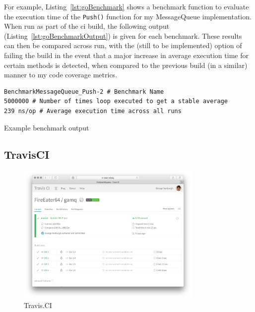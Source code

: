 For example, Listing~\ref{lst:goBenchmark} shows a benchmark function to
evaluate the execution time of the \texttt{Push()} function for my
MessageQueue implementation. When run as part of the \gls{ci} build, the
following output (Listing~\ref{lst:goBenchmarkOutput}) is given for each
benchmark. These results can then be compared across run, with the (still to be
implemented) option of failing the build in the event that a major increase in
average execution time for certain methods is detected, when compared to the
previous build (in a similar) manner to my code coverage metrics.

\begin{listing}
  \centering
  \begin{verbatim}
BenchmarkMessageQueue_Push-2 # Benchmark Name
5000000 # Number of times loop executed to get a stable average
239 ns/op # Average execution time across all runs
  \end{verbatim}
  \caption{Example benchmark output}
  \label{lst:goBenchmarkOutput}
\end{listing}


\subsection{TravisCI}
\label{sub:TravisCI}

\begin{figure}[H]
  \includegraphics[width=0.8\textwidth]{figures/travisScreenshot}
  \centering
  \caption{Travis.CI}
  \label{fig:travisCI}
\end{figure}

